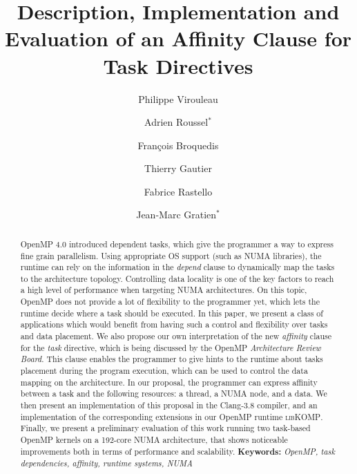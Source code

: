 \documentclass{Styles/llncs}
\newcommand{\libXKOMP}{\textsc{libKOMP}\xspace}
\begin{document}
\title{Description, Implementation and Evaluation of an Affinity Clause for Task Directives}
\author{
  Philippe Virouleau \and Adrien Roussel$^{*}$ \and François Broquedis \and Thierry Gautier \and Fabrice Rastello \and Jean-Marc Gratien$^{*}$
}
\date{}
\maketitle

\begin{abstract}
OpenMP 4.0 introduced dependent tasks, which give the programmer a way to
express fine grain parallelism. Using appropriate OS support (such as NUMA libraries),
the runtime can rely on the information in the \emph{depend} clause to dynamically
map the tasks to the architecture topology.
Controlling data locality is one of the key factors to reach a high level of performance when targeting NUMA architectures.
On this topic, OpenMP does not provide a lot of flexibility to the programmer yet,
which lets the runtime decide where a task should be executed.
In this paper, we present a class of applications which would benefit
from having such a control and flexibility over tasks and data placement.
We also propose our own interpretation of the new \emph{affinity} clause for the \emph{task} directive,
which is being discussed by the OpenMP \emph{Architecture Review Board}.
This clause enables the programmer to give hints to the runtime about
tasks placement during the program execution, which can be used to control the data
mapping on the architecture. In our proposal, the programmer can express affinity between a task and
the following resources: a thread, a NUMA node, and a data.
We then present an implementation of this proposal in the Clang-3.8 compiler,
and an implementation of the corresponding extensions in our OpenMP runtime \libXKOMP.
Finally, we present a preliminary evaluation of this work running two task-based OpenMP kernels on a 192-core NUMA architecture,
that shows noticeable improvements both in terms of performance and scalability.
\smallskip
  \noindent\textbf{Keywords:}
  \emph{
    OpenMP, task dependencies, affinity, runtime systems, NUMA
  }
\end{abstract}
\end{document}
